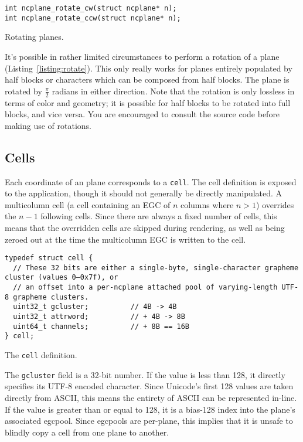 \begin{listing}[!htb]
\begin{verbatim}
int ncplane_rotate_cw(struct ncplane* n);
int ncplane_rotate_ccw(struct ncplane* n);
\end{verbatim}
\caption{Rotating planes.}
\label{listing:rotate}
\end{listing}
It's possible in rather limited circumstances to perform a rotation of a plane
(Listing~\ref{listing:rotate}). This only really works for planes entirely
populated by half blocks or characters which can be composed from half blocks.
The plane is rotated by $\frac{\pi}{2}$ radians in either direction. Note that
the rotation is only lossless in terms of color and geometry; it is possible
for half blocks to be rotated into full blocks, and vice versa. You are
encouraged to consult the source code before making use of rotations.

\subsection{Cells}
\label{sec:cells}
Each coordinate of an plane corresponds to a \texttt{cell}. The cell definition
is exposed to the application, though it should not generally be directly
manipulated. A multicolumn cell (a cell containing an EGC of $n$ columns where
$n>1$) overrides the $n-1$ following cells. Since there are always a fixed
number of cells, this means that the overridden cells are skipped during
rendering, as well as being zeroed out at the time the multicolumn EGC is
written to the cell.
\begin{listing}[!htb]
\begin{verbatim}
typedef struct cell {
  // These 32 bits are either a single-byte, single-character grapheme cluster (values 0–0x7f), or
  // an offset into a per-ncplane attached pool of varying-length UTF-8 grapheme clusters.
  uint32_t gcluster;          // 4B -> 4B
  uint32_t attrword;          // + 4B -> 8B
  uint64_t channels;          // + 8B == 16B
} cell;
\end{verbatim}
\caption{The \texttt{cell} definition.}
\end{listing}
The \texttt{gcluster} field is a 32-bit number. If the value is less than 128,
it directly specifies its UTF-8 encoded character. Since Unicode's first 128
values are taken directly from ASCII, this means the entirety of ASCII can be
represented in-line. If the value is greater than or equal to 128, it is a
bias-128 index into the plane's associated egcpool. Since egcpools are per-plane,
this implies that it is unsafe to blindly copy a cell from one plane to another.

